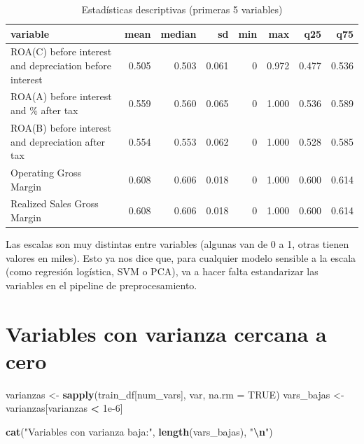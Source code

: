 \documentclass[
]{book}
\newenvironment{Shaded}{\begin{snugshade}}{\end{snugshade}}
\newcommand{\AttributeTok}[1]{\textcolor[rgb]{0.13,0.29,0.53}{#1}}
\newcommand{\ConstantTok}[1]{\textcolor[rgb]{0.56,0.35,0.01}{#1}}
\newcommand{\FloatTok}[1]{\textcolor[rgb]{0.00,0.00,0.81}{#1}}
\newcommand{\FunctionTok}[1]{\textcolor[rgb]{0.13,0.29,0.53}{\textbf{#1}}}
\newcommand{\NormalTok}[1]{#1}
\newcommand{\OtherTok}[1]{\textcolor[rgb]{0.56,0.35,0.01}{#1}}
\newcommand{\SpecialCharTok}[1]{\textcolor[rgb]{0.81,0.36,0.00}{\textbf{#1}}}
\newcommand{\StringTok}[1]{\textcolor[rgb]{0.31,0.60,0.02}{#1}}
\begin{document}
\begin{table}
\centering
\caption{\label{tab:describe}Estadísticas descriptivas (primeras 5 variables)}
\centering
\begin{tabular}[t]{l|r|r|r|r|r|r|r}
\hline
variable & mean & median & sd & min & max & q25 & q75\\
\hline
ROA(C) before interest and depreciation before interest & 0.505 & 0.503 & 0.061 & 0 & 0.972 & 0.477 & 0.536\\
\hline
ROA(A) before interest and \% after tax & 0.559 & 0.560 & 0.065 & 0 & 1.000 & 0.536 & 0.589\\
\hline
ROA(B) before interest and depreciation after tax & 0.554 & 0.553 & 0.062 & 0 & 1.000 & 0.528 & 0.585\\
\hline
Operating Gross Margin & 0.608 & 0.606 & 0.018 & 0 & 1.000 & 0.600 & 0.614\\
\hline
Realized Sales Gross Margin & 0.608 & 0.606 & 0.018 & 0 & 1.000 & 0.600 & 0.614\\
\hline
\end{tabular}
\end{table}

Las escalas son muy distintas entre variables (algunas van de 0 a 1, otras tienen
valores en miles). Esto ya nos dice que, para cualquier modelo sensible a la escala
(como regresión logística, SVM o PCA), va a hacer falta estandarizar las variables en
el pipeline de preprocesamiento.

\section{Variables con varianza cercana a cero}\label{variables-con-varianza-cercana-a-cero}

\begin{Shaded}
\begin{Highlighting}[]
\NormalTok{varianzas  }\OtherTok{\textless{}{-}} \FunctionTok{sapply}\NormalTok{(train\_df[num\_vars], var, }\AttributeTok{na.rm =} \ConstantTok{TRUE}\NormalTok{)}
\NormalTok{vars\_bajas }\OtherTok{\textless{}{-}}\NormalTok{ varianzas[varianzas }\SpecialCharTok{\textless{}} \FloatTok{1e{-}6}\NormalTok{]}

\FunctionTok{cat}\NormalTok{(}\StringTok{"Variables con varianza baja:"}\NormalTok{, }\FunctionTok{length}\NormalTok{(vars\_bajas), }\StringTok{"}\SpecialCharTok{\textbackslash{}n}\StringTok{"}\NormalTok{)}
\end{Highlighting}
\end{Shaded}
\end{document}
